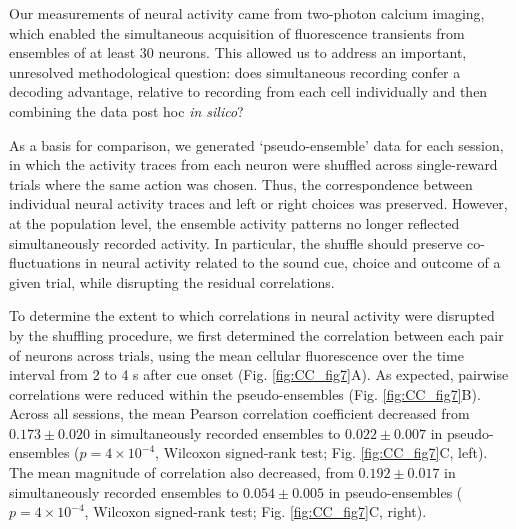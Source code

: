 Our measurements of neural activity came from two-photon calcium imaging, which enabled the simultaneous acquisition of fluorescence transients from ensembles of at least 30 neurons. This allowed us to address an important, unresolved methodological question: does simultaneous recording confer a decoding advantage, relative to recording from each cell individually and then combining the data post hoc \emph{in silico}?

As a basis for comparison, we generated ‘pseudo-ensemble’ data for each session, in which the activity traces from each neuron were shuffled across single-reward trials where the same action was chosen. Thus, the correspondence between individual neural activity traces and left or right choices was preserved. However, at the population level, the ensemble activity patterns no longer reflected simultaneously recorded activity. In particular, the shuffle should preserve co-fluctuations in neural activity related to the sound cue, choice and outcome of a given trial, while disrupting the residual correlations.

To determine the extent to which correlations in neural activity were disrupted by the shuffling procedure, we first determined the correlation between each pair of neurons across trials, using the mean cellular fluorescence over the time interval from 2 to 4 s after cue onset (Fig. \ref{fig:CC_fig7}A). As expected, pairwise correlations were reduced within the pseudo-ensembles (Fig. \ref{fig:CC_fig7}B). Across all sessions, the mean Pearson correlation coefficient decreased from $0.173 \pm 0.020$ in simultaneously recorded ensembles to $0.022 \pm 0.007$ in pseudo-ensembles ($p = 4 \times 10^{-4}$, Wilcoxon signed-rank test; Fig. \ref{fig:CC_fig7}C, left). The mean magnitude of correlation also decreased, from $0.192 \pm 0.017$ in simultaneously recorded ensembles to $0.054 \pm 0.005$ in pseudo-ensembles ($p = 4 \times 10^{-4}$, Wilcoxon signed-rank test; Fig. \ref{fig:CC_fig7}C, right).



